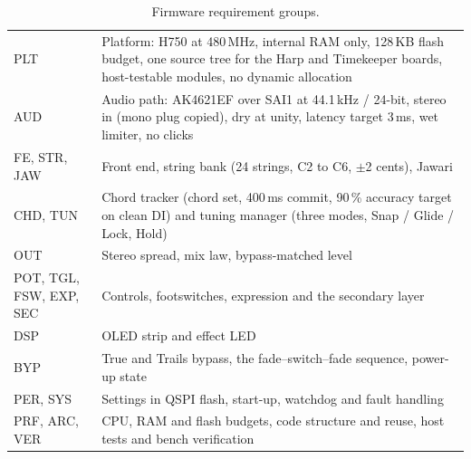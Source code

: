 \begin{table}[H]
  \small\renewcommand{\arraystretch}{1.12}
  \caption{Firmware requirement groups.}\label{tab:reqgroups}
  \begin{tabularx}{\textwidth}{@{}>{\raggedright\arraybackslash}p{26mm} L@{}}
    \toprule
     &  \\
    \midrule
    PLT & Platform: H750 at 480\,MHz, internal RAM only, 128\,KB flash budget, one source tree for the Harp and Timekeeper boards, host-testable modules, no dynamic allocation \\
    AUD & Audio path: AK4621EF over SAI1 at 44.1\,kHz / 24-bit, stereo in (mono plug copied), dry at unity, latency target 3\,ms, wet limiter, no clicks \\
    FE, STR, JAW & Front end, string bank (24 strings, C2 to C6, $\pm$2 cents), Jawari \\
    CHD, TUN & Chord tracker (chord set, 400\,ms commit, 90\,\% accuracy target on clean DI) and tuning manager (three modes, Snap / Glide / Lock, Hold) \\
    OUT & Stereo spread, mix law, bypass-matched level \\
    POT, TGL, FSW, EXP, SEC & Controls, footswitches, expression and the secondary layer \\
    DSP & OLED strip and effect LED \\
    BYP & True and Trails bypass, the fade--switch--fade sequence, power-up state \\
    PER, SYS & Settings in QSPI flash, start-up, watchdog and fault handling \\
    PRF, ARC, VER & CPU, RAM and flash budgets, code structure and reuse, host tests and bench verification \\
    \bottomrule
  \end{tabularx}
\end{table}
